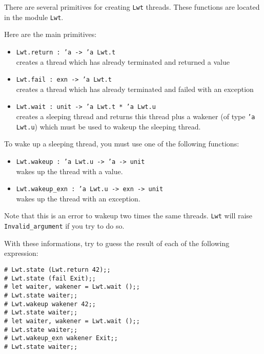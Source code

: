 There are several primitives for creating {\tt Lwt} threads. These
functions are located in the module {\tt Lwt}.



Here are the main primitives:



\begin{itemize}
\item  {\tt Lwt.return : 'a -> 'a Lwt.t}
\mbox{}\\
creates a thread which has already terminated and returned a value
\item  {\tt Lwt.fail : exn -> 'a Lwt.t}
\mbox{}\\
creates a thread which has already terminated and failed with an
exception
\item  {\tt Lwt.wait : unit -> 'a Lwt.t * 'a Lwt.u}
\mbox{}\\
creates a sleeping thread and returns this thread plus a wakener (of
type {\tt 'a Lwt.u}) which must be used to wakeup the sleeping
thread.

\end{itemize}

To wake up a sleeping thread, you must use one of the following
functions:



\begin{itemize}
\item  {\tt Lwt.wakeup : 'a Lwt.u -> 'a -> unit}
\mbox{}\\
wakes up the thread with a value.
\item  {\tt Lwt.wakeup\_exn : 'a Lwt.u -> exn -> unit}
\mbox{}\\
wakes up the thread with an exception.

\end{itemize}

Note that this is an error to wakeup two times the same threads. {\tt Lwt}
will raise {\tt Invalid\_argument} if you try to do so.



With these informations, try to guess the result of each of the
following expression:



\lstset{language=[Objective]Caml}\begin{lstlisting}
# Lwt.state (Lwt.return 42);;
# Lwt.state (fail Exit);;
# let waiter, wakener = Lwt.wait ();;
# Lwt.state waiter;;
# Lwt.wakeup wakener 42;;
# Lwt.state waiter;;
# let waiter, wakener = Lwt.wait ();;
# Lwt.state waiter;;
# Lwt.wakeup_exn wakener Exit;;
# Lwt.state waiter;;

\end{lstlisting}
